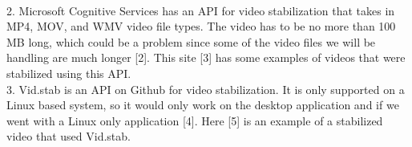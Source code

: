 \documentclass[10pt,draftclsnofoot,onecolumn]{IEEEtran}
\newcommand\tab[1][1cm]{\hspace*{#1}}
\begin{document}
\\
\tab \tab \tab 2. Microsoft Cognitive Services has an API for video stabilization that takes in MP4, MOV, \tab \tab \tab and WMV video file types. The video has to be no more than 100 MB long, which could be \newline \tab \tab \tab a problem since some of the video files we will be handling are much longer [2]. This site [3] \tab \tab \tab has some examples of videos that were stabilized using this API.  \\
\tab \tab \tab 3. Vid.stab is an API on Github for video stabilization. It is only supported on a Linux based \tab \tab \tab system, so it would only work on the desktop application and if we went with a Linux only \tab \tab \tab application [4]. Here [5] is an example of a stabilized video that used Vid.stab.
\end{document}
